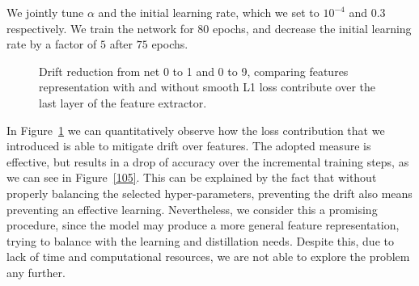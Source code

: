 \documentclass[10pt,twocolumn,letterpaper]{article}
\begin{document}
We jointly tune $\alpha$ and the initial learning rate, which we set to $10^{-4}$ and $0.3$ respectively. We train the network for $80$ epochs, and decrease the initial learning rate by a factor of $5$ after $75$ epochs.

\begin{figure}
\begin{center}
\end{center}
\caption{Drift reduction from net 0 to 1 and 0 to 9, comparing features representation with and without smooth L1 loss contribute over the last layer of the feature extractor.}
\label{5:histogram2}
\end{figure}

In Figure~\ref{5:histogram2} we can quantitatively observe how the loss contribution that we introduced is able to mitigate drift over features. The adopted measure is effective, but results in a drop of accuracy over the incremental training steps, as we can see in Figure~\ref{105}. This can be explained by the fact that without properly balancing the selected hyper-parameters, preventing the drift also means preventing an effective learning. Nevertheless, we consider this a promising procedure, since the model may produce a more general feature representation, trying to balance with the learning and distillation needs. Despite this, due to lack of time and computational resources, we are not able to explore the problem any further.
\end{document}
